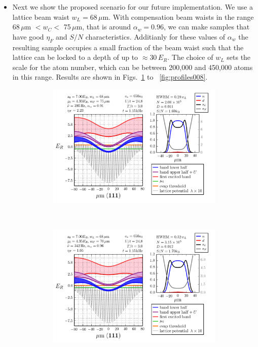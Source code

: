 \documentclass[11pt,letter]{article}
\newcommand{\awaist}{\ensuremath{ \alpha_{w} }}
\begin{document}
\begin{itemize}
\item Next we show the proposed scenario for our future implementation.  We use
a lattice beam waist $w_{L}=68\,\mu$m.  With compensation beam waists in the
range 68\,$\mu$m $< w_{C} < $ 75\,$\mu$m,  that is around $\awaist = 0.96$, we
can make samples that have good $\eta_{F}$ and $S/N$ characteristics.
Additianly for these values of $\awaist$ the resulting sample occupies a small
fraction of the beam waist such that the lattice can be locked to a depth of up
to $\approx 30\,E_{R}$.    The choice of $w_{L}$ sets the scale for the atom
number, which can be between 200,000 and 450,000 atoms in this range.   Results
are shown in Figs.~\ref{fig:profiles006} to ~\ref{fig:profiles008}.  
\begin{figure}[H]
        \centering
        \begin{subfigure}[t]{0.42\textwidth}
		\includegraphics[width=\textwidth]{figures_hubbard-lda/006.png}
\caption{ }
                \label{fig:profiles006}
        \end{subfigure}%
        ~~ %
        \begin{subfigure}[t]{0.42\textwidth}
		\includegraphics[width=\textwidth]{figures_hubbard-lda/007.png}
\caption{ }
                \label{fig:profiles007}
        \end{subfigure}


\end{figure}
\end{itemize}
\end{document}
